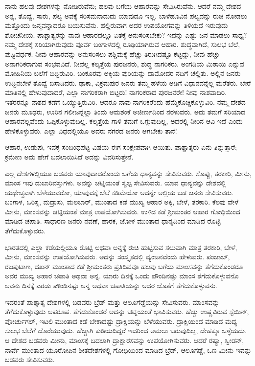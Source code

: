 \newpage

ನಾನು ಹಲವು ದೇಶಗಳನ್ನು ನೋಡಿರುವೆನು; ಹಲವು ಬಗೆಯ ಆಹಾರವನ್ನು ಸೇವಿಸಿರುವೆನು. ಆದರೆ ನಮ್ಮ ದೇಶದ ಅನ್ನ, ತೊವ್ವೆ, ಸಾರು, ಪಲ್ಯ ಅವಕ್ಕೆ ಸರಿಸಮ\break ನಾದುದು ಯಾವುದೂ ಇಲ್ಲ. ಬಾಳೆಹೂವಿನ ಪಲ್ಯವನ್ನು ರುಚಿ ನೋಡಲು ಮತ್ತೊಂದು ಜನ್ಮವನ್ನಾದರೂ ಬಯಸುವೆನು. ಹಲ್ಲಿರುವಾಗ ಅದರ ಉಪಯೋಗವನ್ನು ತಿಳಿಯದೆ ಇರುವುದು ಶೋಚನೀಯ. ಪಾಶ್ಚಾತ್ಯರನ್ನು ನಾವು ಆಹಾರದಲ್ಲೂ ಏತಕ್ಕೆ ಅನುಸರಿಸಬೇಕು? ಇದನ್ನು ಎಷ್ಟು ಜನ ಮಾಡಲು ಸಾಧ್ಯ? ನಮ್ಮ ದೇಶಕ್ಕೆ ಸರಿಯಾಗಿರುವುದು ಪೂರ್ವ ಬಂಗಾಳದಲ್ಲಿ ರೂಢಿಯಾಗಿರುವ ಆಹಾರ. ಶುದ್ಧವಾಗಿದೆ, ಸುಲಭ ಬೆಲೆ, ಪುಷ್ಟಿವರ್ಧಕ. ನೀವು ಆಹಾರವನ್ನು ಅನುಸರಿಸಲು ಪಶ್ಚಿಮಕ್ಕೆ ಹೆಚ್ಚು ತಿರುಗಿದಷ್ಟೂ ಕೆಟ್ಟದ್ದು, ನೀವು ಹೆಚ್ಚು ಅನಾಗರಿಕರಾಗುವ ಸಂಭವವಿದೆ. ನೀವೆಲ್ಲ ಕಲ್ಕತ್ತೆಯ ಪುರಜನರು, ಶುದ್ಧ ನಾಗರಿಕರು. ಅಂಗಡಿಯ ಮಿಠಾಯಿ ಎನ್ನುವ ಮೋಹಿನಿಯ ಬಲೆಗೆ ಬಿದ್ದಿರುವಿರಿ. ಬಂಕೂರವು ಅಕ್ಕಿಯ ಪುರಿಯನ್ನು ದಾಮೋದರ ನದಿಗೆ ಚೆಲ್ಲಿತು. ಅಲ್ಲಿನ ಜನರು ಉದ್ದಿನಬೇಳೆ ತೊವ್ವೆ ಬಿಸಾಡಿದರು. ಢಾಕಾ, ವಿಕ್ರಮಪುರ ಜನರು ತಮ್ಮ ಹಳೆಯ ಅಡಿಗೆ ವಿಧಾನವನ್ನೆಲ್ಲ ಮರೆತರು. ಬೇರೆ ಮಾತಿನಲ್ಲಿ ಹೇಳುವುದಾದರೆ, ಎಲ್ಲಾ ನಾಗರಿಕರಾಗಿ ಬಿಟ್ಟರು! ನಾಗರಿಕರಾದ ಪುರಜನರೇ! ನೀವು ನಾಶವಾದಿರಿ. ಇತರರನ್ನೂ ನಾಶದ ಕಡೆಗೆ ಒಯ್ಯುತ್ತಿರುವಿರಿ. ಆದರೂ ನಾವು ನಾಗರಿಕರೆಂದು ಹೆಮ್ಮೆಕೊಚ್ಚಿಕೊಳ್ಳುವಿರಿ. ನಮ್ಮ ದೇಶದ ಜನರು ಮೂಢರು, ಊರಿನ ಗಲೀಜನ್ನೆಲ್ಲಾ ತಿಂದು ಆಮಶಂಕೆ ಅಜೀರ್ಣದಿಂದ ನರಳುವರು. ಅದು ತಮಗೆ ಸರಿಯಾದ ಆಹಾರವಲ್ಲವೆಂದು ಒಪ್ಪಿಕೊಳ್ಳುವುದಿಲ್ಲ. ಕಲ್ಕತ್ತೆಯ ಗಾಳಿ ತಮಗೆ ಒಗ್ಗುವುದಿಲ್ಲ, ಅದರಲ್ಲಿ ನೀರಿನ ಆವಿ ಇದೆ ಎಂದು ಹೇಳಿಕೊಳ್ಳುವರು. ಎಲ್ಲಾ ವಿಧದಲ್ಲಿಯೂ ಅವರು ನಗರದ ಜನರು ಆಗಬೇಕು ತಾನೆ!

ಆಹಾರ, ಉಡುಪು, ಇವಕ್ಕೆ ಸಂಬಂಧಪಟ್ಟ ವಿಷಯ ಈಗ ಸಂಕ್ಷೇಪವಾಗಿ ಆಯಿತು. ಪಾಶ್ಚಾತ್ಯರು ಏನು ತಿನ್ನುತ್ತಾರೆ; ಕ್ರಮೇಣ ಅದು ಹೇಗೆ ಬದಲಾಯಿಸಿದೆ ಅದನ್ನು ವಿವರಿಸುತ್ತೇನೆ.

ಎಲ್ಲ ದೇಶಗಳಲ್ಲಿಯೂ ಬಡವರು ಯಾವುದಾದರೊಂದು ಬಗೆಯ ಧಾನ್ಯವನ್ನು ಸೇವಿಸುವರು. ಸೊಪ್ಪು, ತರಕಾರಿ, ಮೀನು, ಮಾಂಸ ಇವು ದುಬಾರಿವಸ್ತುಗಳು. ಅವನ್ನು ಚಟ್ನಿಯಂತೆ ಸ್ವಲ್ಪ ಸೇವಿಸುವರು. ಯಾವ ಧಾನ್ಯವನ್ನು ದೇಶದಲ್ಲಿ ಯಥೇಚ್ಚವಾಗಿ ಬೆಳೆಯು\break ವರೋ, ಯಾವುದಕ್ಕೆ ಬೆಲೆ ಕಡಿಮೆಯೋ ಅದನ್ನೇ ಅಲ್ಲಿಯ ಬಡ ಜನರು ಸೇವಿಸುವರು. ಬಂಗಾಳ, ಒರಿಸ್ಸ, ಮದ್ರಾಸು, ಮಲಬಾರ್​, ಮುಂತಾದ ಕಡೆ ಮುಖ್ಯ ಆಹಾರ ಅಕ್ಕಿ, ಬೇಳೆ, ತರಕಾರಿ. ಕೆಲವು ವೇಳೆ ಮೀನು, ಮಾಂಸವನ್ನು ಚಟ್ನಿಯಂತೆ ಮಾತ್ರ ಉಪಯೋಗಿಸುವರು. ಉಳಿದ ಕಡೆ ಶ‍್ರೀಮಂತರ ಆಹಾರ ಗೋಧಿಯಿಂದ ಮಾಡಿದ ಚಪಾತಿ. ಸಾಧಾರಣ ಜನರು ನವಣೆ, ಹಾರಕ, ಜೋಳ ಮುಂತಾದ ಧಾನ್ಯದಿಂದ ಮಾಡಿದ ರೊಟ್ಟಿ ತೆಗೆದುಕೊಳ್ಳುವರು.

ಭಾರತದಲ್ಲಿ ಎಲ್ಲಾ ಕಡೆಯಲ್ಲಿಯೂ ರೊಟ್ಟಿ ಅಥವಾ ಅನ್ನಕ್ಕೆ ರುಚಿ ಹುಟ್ಟಿಸುವ ಸಲುವಾಗಿ ಮಾತ್ರ ತರಕಾರಿ, ಬೇಳೆ, ಮೀನು, ಮಾಂಸವನ್ನು ಉಪಯೋಗಿಸುವರು. ಅದನ್ನು ಸಂಸ್ಕೃತದಲ್ಲಿ ವ್ಯಂಜನವೆಂದು ಹೇಳುವರು. ಪಂಜಾಬ್​, ರಜಪುಟಾಣ, ದಖನ್​ ಮುಂತಾದ ಕಡೆ ಶ‍್ರೀಮಂತರು ಪ್ರತಿದಿವವೂ ಹಲವು ಬಗೆಯ ಮಾಂಸವನ್ನು ತೆಗೆದುಕೊಂಡರೂ ಅವರ ಮುಖ್ಯ ಅಹಾರ ಚಪಾತಿ ಅಥವಾ ಅನ್ನ. ಯಾರು ದಿನಕ್ಕೆ ಒಂದು ಪೌಂಡಿನಷ್ಟು ಮಾಂಸ ತೆಗೆದುಕೊಳ್ಳುವನೊ ಅವನು ದಿನಕ್ಕೆ ಎರಡು ಪೌಂಡಿನಷ್ಟು ಅನ್ನ ಅಥವಾ ಚಪಾತಿಯನ್ನು ಅದರ ಜೊತೆಗೆ ತೆಗೆದುಕೊಳ್ಳುವನು.

ಇದರಂತೆ ಪಾಶ್ಚಾತ್ಯ ದೇಶಗಳಲ್ಲಿ ಬಡವರು ಬ್ರೆಡ್​ ಮತ್ತು ಆಲೂಗೆಡ್ಡೆಯನ್ನು ಸೇವಿಸು\break ವರು. ಮಾಂಸವನ್ನು ತೆಗೆದುಕೊಳ್ಳುವುದು ಅಪರೂಪ. ತೆಗೆದುಕೊಂಡರೆ ಅದನ್ನು ಚಟ್ನಿ\break ಯಂತೆ ಭಾವಿಸುವರು. ಹೆಚ್ಚು ಉಷ್ಣವಿರುವ ಸ್ಪೆಯಿನ್​, ಪೋರ್ಚುಗಲ್​, ಇಟಲಿ ಮುಂತಾದ ಕಡೆ ಬೇಕಾದಷ್ಟು ದ್ರಾಕ್ಷಿಯನ್ನು ಬೆಳೆಯುವರು. ದ್ರಾಕ್ಷಿಯಿಂದ ಮಾಡಿದ ಮದ್ಯ ಸುಲಭ ಬೆಲೆಗೆ ದೊರೆಯುವುದು. ಹೆಚ್ಚಾಗಿ ಕುಡಿಯದಿದ್ದರೆ ಇದರಿಂದ ಅಮಲು ಬರುವುದಿಲ್ಲ, ದೇಹಕ್ಕೂ ಒಳ್ಳೆಯದು. ಆ ದೇಶದ ಬಡವರು ಮೀನು, ಮಾಂಸಕ್ಕೆ ಬದಲಾಗಿ ದ್ರಾಕ್ಷಾರಸ\break ವನ್ನು ಉಪಯೋಗಿಸುವರು. ಆದರೆ ರಷ್ಯಾ, ಸ್ವೀಡನ್​, ನಾರ್ವೆ ಮುಂತಾದ ಯೂರೋಪಿನ ಶೀತದೇಶಗಳಲ್ಲಿ ಗೋಧಿಯಿಂದ ಮಾಡಿದ ಬ್ರೆಡ್​, ಆಲೂಗಡ್ಡೆ, ಒಣ ಮೀನು ಇವನ್ನು ಬಡವರು ಸೇವಿಸುವರು.

